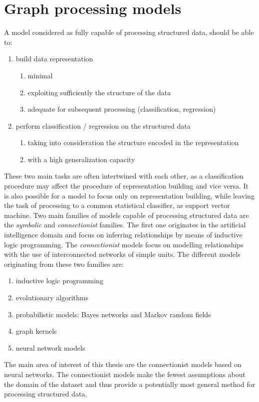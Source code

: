 
\chapter{Graph processing models}
\noindent A model considered as fully capable of processing structured data, should be able to:
\begin{enumerate}
	\item build data representation
	\begin{enumerate}
		\item minimal
		\item exploiting sufficiently the structure of the data
		\item adequate for subsequent processing (classification, regression)
	\end{enumerate}
	\item perform classification / regression on the structured data
	\begin{enumerate}
		\item taking into consideration the structure encoded in the representation
		\item with a high generalization capacity
	\end{enumerate}
\end{enumerate}
These two main tasks are often intertwined with each other, as a classification procedure may affect the procedure of representation building and vice versa. It is also possible for a model to focus only on representation building, while leaving the task of processing to a common statistical classifier, as support vector machine. Two main families of models capable of processing structured data are the \emph{symbolic} and \emph{connectionist} families. The first one originates in the artificial intelligence domain and focus on inferring relationships by means of inductive logic programming. The \emph{connectionist} models focus on modelling relationships with the use of interconnected networks of simple units. The different models originating from these two families are:
\begin{enumerate}
	\item inductive logic programming
	\item evolutionary algorithms
	\item probabilistic models: Bayes networks and Markov random fields
	\item graph kernels
	\item neural network models
\end{enumerate}
The main area of interest of this thesis are the connectionist models based on neural networks. The connectionist models make the fewest assumptions about the domain of the dataset and thus provide a potentially most general method for processing structured data.

